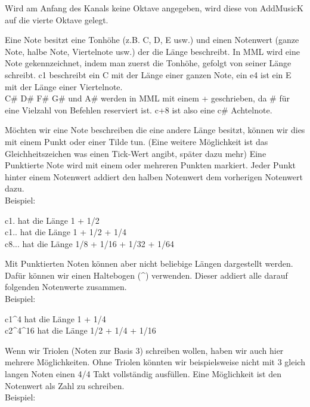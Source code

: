 Wird am Anfang des Kanals keine Oktave angegeben, wird diese von AddMusicK auf die vierte Oktave gelegt.

\bigskip

Eine Note besitzt eine Tonhöhe (z.B. C, D, E usw.) und einen Notenwert (ganze Note, halbe Note, Viertelnote usw.) der die Länge beschreibt.
In MML wird eine Note gekennzeichnet, indem man zuerst die Tonhöhe, gefolgt von seiner Länge schreibt.
c1 beschreibt ein C mit der Länge einer ganzen Note, ein e4 ist ein E mit der Länge einer Viertelnote. \\
C\# D\# F\# G\# und A\# werden in MML mit einem + geschrieben, da \# für eine Vielzahl von Befehlen reserviert ist. c+8 ist also eine c\# Achtelnote.

\bigskip

Möchten wir eine Note beschreiben die eine andere Länge besitzt, können wir dies mit einem Punkt oder einer Tilde tun. (Eine weitere Möglichkeit ist das Gleichheitszeichen was einen Tick-Wert angibt, später dazu mehr) Eine Punktierte Note wird mit einem oder mehreren Punkten markiert. Jeder Punkt hinter einem Notenwert addiert den halben Notenwert dem vorherigen Notenwert dazu. \\
Beispiel:

\bigskip

c1. hat die Länge 1 + 1/2 \\
c1.. hat die Länge 1 + 1/2 + 1/4 \\
c8... hat die Länge 1/8 + 1/16 + 1/32 + 1/64

\bigskip

Mit Punktierten Noten können aber nicht beliebige Längen dargestellt werden.
Dafür können wir einen Haltebogen (\textasciicircum) verwenden. Dieser addiert alle darauf folgenden Notenwerte zusammen. \\
Beispiel:

\bigskip

c1\textasciicircum4 hat die Länge 1 + 1/4 \\
c2\textasciicircum4\textasciicircum16 hat die Länge 1/2 + 1/4 + 1/16

\bigskip

Wenn wir Triolen (Noten zur Basis 3) schreiben wollen, haben wir auch hier mehrere Möglichkeiten.
Ohne Triolen könnten wir beispielsweise nicht mit 3 gleich langen Noten einen 4/4 Takt vollständig ausfüllen.
Eine Möglichkeit ist den Notenwert als Zahl zu schreiben. \\
Beispiel:

\bigskip

